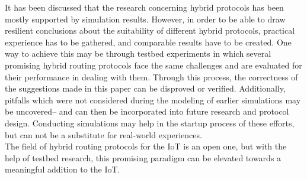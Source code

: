 \documentclass[a4paper,10pt]{scrartcl}
\begin{document}
It has been discussed that the research concerning hybrid protocols has been mostly supported by simulation results.
However, in order to be able to draw resilient conclusions about the suitability of different hybrid protocols, practical experience has to be gathered, and comparable results have to be created. One way to achieve this may be through testbed experiments in which several promising hybrid routing protocols face the same challenges and are evaluated for their performance in dealing with them. Through this process, the correctness of the suggestions made in this paper can be disproved or verified. Additionally, pitfalls which were not considered during the modeling of earlier simulations may be uncovered-- and can then be incorporated into future research and protocol design.
Conducting simulations may help in the startup process of these efforts, but can not be a substitute for real-world experiences.\\

The field of hybrid routing protocols for the IoT is an open one, but with the help of testbed research, this promising paradigm can be elevated towards a meaningful addition to the IoT.



\newpage

\printglossaries

{\small


}
\end{document}
